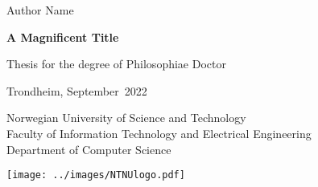 \documentclass[../main.tex]{subfiles}
\begin{document}
\frontmatter
{
\sffamily
\parindent=0cm
\renewcommand{\headrulewidth}{0pt}
\addtolength{\parskip}{\baselineskip}
{\huge {Author Name}}
\vspace{2cm}

{\textbf {\fontsize{27}{32}\selectfont A Magnificent Title}}

{\LARGE }
\vspace{5cm}

{\Large Thesis for the degree of Philosophiae Doctor

Trondheim, September\ 2022

Norwegian University of Science and Technology \\
Faculty of Information Technology and Electrical Engineering \\
Department of Computer Science}
\vspace{5cm}

\texttt{[image: ../images/NTNUlogo.pdf]}

\newpage
}
\end{document}
